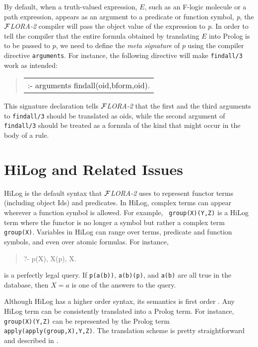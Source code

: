 \documentclass[11pt]{article}
\newenvironment{qrules}{\begin{quote}\tt\begin{tabular}[t]{l}}%
{\end{tabular}\end{quote}}
\newcommand{\FLORA}{{\mbox{${\cal F}${\small\it LORA}\rm\emph{-2}}}\xspace}
\newcommand{\fl}{\mbox{F-logic}\xspace}
\begin{document}
%
By default, when a truth-valued expression, $E$, such as an \fl molecule or
a path expression, appears as an argument to a predicate or function
symbol, {\it p}, the \FLORA compiler will pass the object value of the
expression to {\it p}. In order to tell the compiler that the entire
formula obtained by translating $E$ into Prolog is to be passed to $p$, we
need to define the \emph{meta signature} of $p$ using the compiler
directive {\tt arguments}.  For instance, the following directive will make
{\tt findall/3} work as intended:
\begin{qrules}
:- arguments findall(oid,bform,oid).
\end{qrules}
This signature declaration tells \FLORA that the first and the third
arguments to {\tt findall/3} should be translated as oids, while the second
argument of {\tt findall/3} should be treated as a formula of the kind that
might occur in the body of a rule.



\section{HiLog and Related Issues} \label{sec:hilog}


%
HiLog \cite{hilog-jlp} is the default syntax that \FLORA uses to represent
functor terms (including object Ids) and predicates.  In HiLog, complex
terms can appear wherever a function symbol is allowed. For example, {\tt
  group(X)(Y,Z)} is a HiLog term where the functor is no longer a symbol
but rather a complex term {\tt group(X)}. Variables in HiLog can range over
terms, predicate and function symbols, and even over atomic formulas. For
instance,
\begin{quote}
 ?- p(X), X(p), X.  
\end{quote}
is a perfectly legal query. If {\tt p(a(b))}, {\tt a(b)(p)},
and {\tt a(b)} are all true in the database, then $X=a$ is one of the
answers to the query.

%
Although HiLog has a higher order syntax, its semantics is first order
\cite{hilog-jlp}. Any HiLog term can be consistently translated into a
Prolog term. For instance, {\tt group(X)(Y,Z)} can be represented by the
Prolog term {\tt apply(apply(group,X),Y,Z)}. The translation scheme is
pretty straightforward and described in \cite{hilog-jlp}.
\end{document}
